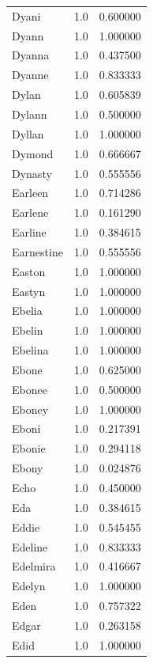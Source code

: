 \documentclass[
  letterpaper,
  DIV=11,
  numbers=noendperiod]{scrreprt}
\begin{document}
\begin{tabular}{lrr}
Dyani           &   1.0 &   0.600000 \\
Dyann           &   1.0 &   1.000000 \\
Dyanna          &   1.0 &   0.437500 \\
Dyanne          &   1.0 &   0.833333 \\
Dylan           &   1.0 &   0.605839 \\
Dylann          &   1.0 &   0.500000 \\
Dyllan          &   1.0 &   1.000000 \\
Dymond          &   1.0 &   0.666667 \\
Dynasty         &   1.0 &   0.555556 \\
Earleen         &   1.0 &   0.714286 \\
Earlene         &   1.0 &   0.161290 \\
Earline         &   1.0 &   0.384615 \\
Earnestine      &   1.0 &   0.555556 \\
Easton          &   1.0 &   1.000000 \\
Eastyn          &   1.0 &   1.000000 \\
Ebelia          &   1.0 &   1.000000 \\
Ebelin          &   1.0 &   1.000000 \\
Ebelina         &   1.0 &   1.000000 \\
Ebone           &   1.0 &   0.625000 \\
Ebonee          &   1.0 &   0.500000 \\
Eboney          &   1.0 &   1.000000 \\
Eboni           &   1.0 &   0.217391 \\
Ebonie          &   1.0 &   0.294118 \\
Ebony           &   1.0 &   0.024876 \\
Echo            &   1.0 &   0.450000 \\
Eda             &   1.0 &   0.384615 \\
Eddie           &   1.0 &   0.545455 \\
Edeline         &   1.0 &   0.833333 \\
Edelmira        &   1.0 &   0.416667 \\
Edelyn          &   1.0 &   1.000000 \\
Eden            &   1.0 &   0.757322 \\
Edgar           &   1.0 &   0.263158 \\
Edid            &   1.0 &   1.000000 \\

\end{tabular}
\end{document}
